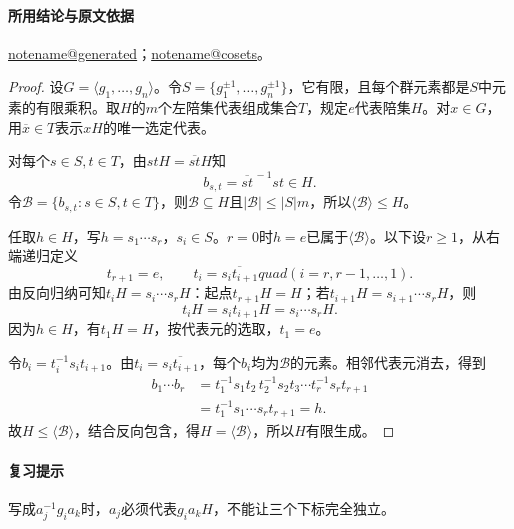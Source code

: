 \documentclass[UTF8,a4paper,11pt,fontset=windows]{ctexart}
\makeatletter
\newcommand{\noteref}[1]{\hyperref[note:#1]{\csname notename@#1\endcsname}}
\newcommand{\exref}[2]{\hyperref[ex:#1:#2]{第#1章习题#2}}
\makeatother
\begin{document}
\paragraph{所用结论与原文依据}
\noteref{generated}；\noteref{cosets}。


\begin{proof}
设$G=\langle g_1,\ldots,g_n\rangle$。令$S=\{g_1^{\pm1},\ldots,g_n^{\pm1}\}$，它有限，且每个群元素都是$S$中元素的有限乘积。取$H$的$m$个左陪集代表组成集合$T$，规定$e$代表陪集$H$。对$x\in G$，用$\overline x\in T$表示$xH$的唯一选定代表。

对每个$s\in S,t\in T$，由$stH=\overline{st}H$知
\[
b_{s,t}=\overline{st}^{\,-1}st\in H.
\]
令$\mathcal B=\{b_{s,t}:s\in S,t\in T\}$，则$\mathcal B\subseteq H$且$|\mathcal B|\leq|S|m$，所以$\langle\mathcal B\rangle\leq H$。

任取$h\in H$，写$h=s_1\cdots s_r$，$s_i\in S$。$r=0$时$h=e$已属于$\langle\mathcal B\rangle$。以下设$r\geq1$，从右端递归定义
\[
t_{r+1}=e,\qquad t_i=\overline{s_it_{i+1}}quad(i=r,r-1,\ldots,1).
\]
由反向归纳可知$t_iH=s_i\cdots s_rH$：起点$t_{r+1}H=H$；若$t_{i+1}H=s_{i+1}\cdots s_rH$，则
\[
t_iH=s_it_{i+1}H=s_i\cdots s_rH.
\]
因为$h\in H$，有$t_1H=H$，按代表元的选取，$t_1=e$。

令$b_i=t_i^{-1}s_it_{i+1}$。由$t_i=\overline{s_it_{i+1}}$，每个$b_i$均为$\mathcal B$的元素。相邻代表元消去，得到
\begin{align*}
b_1\cdots b_r
&=t_1^{-1}s_1t_2\,t_2^{-1}s_2t_3\cdots t_r^{-1}s_rt_{r+1}\\
&=t_1^{-1}s_1\cdots s_rt_{r+1}=h.
\end{align*}
故$H\leq\langle\mathcal B\rangle$，结合反向包含，得$H=\langle\mathcal B\rangle$，所以$H$有限生成。
\end{proof}

\paragraph{复习提示}
写成$a_j^{-1}g_i a_k$时，$a_j$必须代表$g_i a_kH$，不能让三个下标完全独立。
\end{document}

